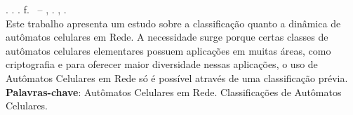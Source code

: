 % 
%


\begin{resumo}[RESUMO]
\begin{SingleSpacing}

\imprimirautorcitacao. \imprimirtitulo. \imprimirdata. \pageref {LastPage} f. \imprimirprojeto\ – \imprimirprograma, \imprimirinstituicao. \imprimirlocal, \imprimirdata.\\

Este trabalho apresenta um estudo sobre a classificação quanto a dinâmica de autômatos celulares em Rede. A necessidade surge porque certas classes de autômatos celulares elementares possuem aplicações em muitas áreas, como criptografia e para oferecer maior diversidade nessas aplicações, o uso de Autômatos Celulares em Rede só é possível através de uma classificação prévia.     \\

\textbf{Palavras-chave}: Autômatos Celulares em Rede. Classificações de Autômatos Celulares.

\end{SingleSpacing}
\end{resumo}

